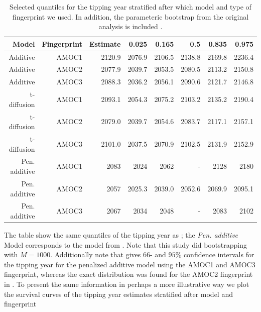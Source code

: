 \begin{table}[ht]
    \centering
    \begin{tabular}{rrrrrrrr}
    Model & Fingerprint & Estimate    & 0.025  & 0.165  & 0.5    & 0.835  & 0.975 \\ 
      \hline
    Additive & AMOC1 & 2120.9         & 2076.9 & 2106.5 & 2138.8 & 2169.8 & 2236.4 \\
    Additive & AMOC2 & 2077.9         & 2039.7 & 2053.5 & 2080.5 & 2113.2 & 2150.8 \\ 
    Additive & AMOC3 & 2088.3         & 2036.2 & 2056.1 & 2090.6 & 2121.7 & 2146.8 \\ 
    t-diffusion & AMOC1 & 2093.1      & 2054.3 & 2075.2 & 2103.2 & 2135.2 & 2190.4 \\ 
    t-diffusion & AMOC2 & 2079.0      & 2039.7 & 2054.6 & 2083.7 & 2117.1 & 2157.1 \\ 
    t-diffusion & AMOC3 & 2101.0      & 2037.5 & 2070.9 & 2102.5 & 2131.9 & 2152.9 \\ 
    Pen. additive& AMOC1 & 2083       & 2024 & 2062 & - & 2128 & 2180 \\
    Pen. additive& AMOC2 & 2057       & 2025.3 & 2039.0 & 2052.6 & 2069.9 & 2095.1 \\ 
    Pen. additive& AMOC3 & 2067       & 2034 & 2048 & - & 2083 & 2102 \\
       \hline
    \end{tabular}
    \caption{Selected quantiles for the tipping year stratified after which model and type of fingerprint we used. In addition, the parameteric bootstrap from the original analysis is included \cite{Ditlevsen2023}.}
    \label{table:tipping_quantiles}
\end{table}
The table show the same quantiles of the tipping year as \cite{DitlevsenSupplementary}; the \textit{Pen. additive} Model corresponds to the model from \cite{Ditlevsen2023}. Note that this study did bootstrapping with $M = 1000$. Additionally note that \cite[table 1]{Ditlevsen2023} gives $66$- and $95\%$ confidence intervals for the tipping year for the penalized additive model using the AMOC1 and AMOC3 fingerprint, whereas the exact distribution was found for the AMOC2 fingerprint in \cite{DitlevsenSupplementary}. To present the same information in perhaps a more illustrative way we plot the survival curves of the tipping year estimates stratified after model and fingerprint
